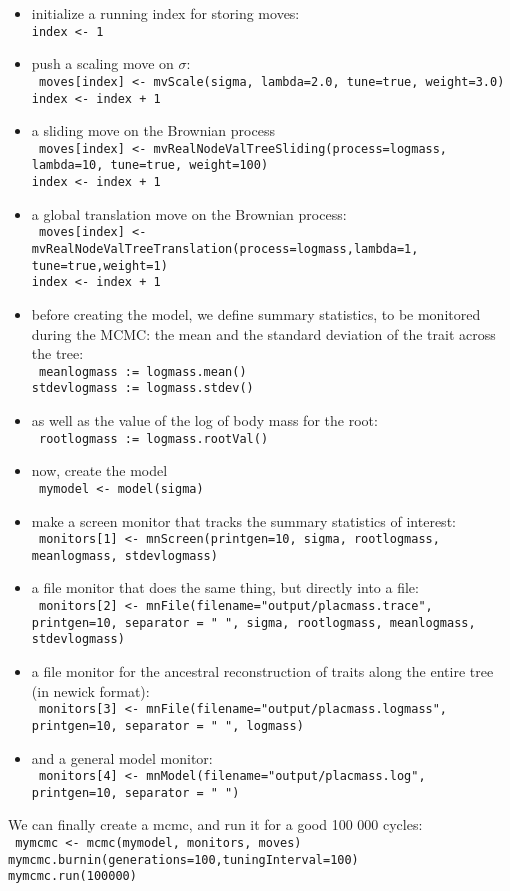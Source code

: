 \documentclass[usletter]{article}
\newcommand{\cmd}[1]{\texttt{#1}}
\begin{document}
\begin{itemize}
\item
initialize a running index for storing moves:
\\
\cmd{index <- 1}
\item
push a scaling move on $\sigma$:
\\
\cmd{
moves[index] <- mvScale(sigma, lambda=2.0, tune=true, weight=3.0)
\\
index <- index + 1
}
\item
a sliding move on the Brownian process
\\
\cmd{
moves[index] <- mvRealNodeValTreeSliding(process=logmass, lambda=10, tune=true, weight=100)
\\
index <- index + 1
}
\item
a global translation move on the Brownian process:
\\
\cmd{
moves[index] <- mvRealNodeValTreeTranslation(process=logmass,lambda=1,
\\
tune=true,weight=1)
\\
index <- index + 1
}
\item
before creating the model, we define summary statistics, to be monitored during the MCMC: the mean and the standard deviation of the trait across the tree:
\\
\cmd{
meanlogmass := logmass.mean()
\\
stdevlogmass := logmass.stdev()
}
\item
as well as the value of the log of body mass for the root:
\\
\cmd{
rootlogmass := logmass.rootVal()
}
\item
now, create the model
\\
\cmd{
mymodel <- model(sigma)
}
\item
make a screen monitor that tracks the summary statistics of interest:
\\
\cmd{
monitors[1] <- mnScreen(printgen=10, sigma, rootlogmass, meanlogmass, stdevlogmass)
}
\item
a file monitor that does the same thing, but directly into a file:
\\
\cmd{
monitors[2] <- mnFile(filename="output/placmass.trace", printgen=10, separator = "       ", sigma, rootlogmass, meanlogmass, stdevlogmass)
}
\item
a file monitor for the ancestral reconstruction of traits along the entire tree (in newick format):
\\
\cmd{
monitors[3] <- mnFile(filename="output/placmass.logmass", printgen=10, separator = "       ", logmass)
}
\item
and a general model monitor:
\\
\cmd{
monitors[4] <- mnModel(filename="output/placmass.log", printgen=10, separator = " ")
}
\end{itemize}
We can finally create a mcmc, and run it for a good 100 000 cycles:
\\
\cmd{
mymcmc <- mcmc(mymodel, monitors, moves)
\\
mymcmc.burnin(generations=100,tuningInterval=100)
\\
mymcmc.run(100000)
}
\end{document}
